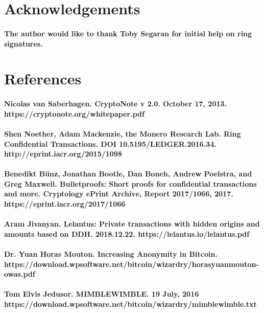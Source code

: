 \documentclass{article}
\begin{document}
\section{Acknowledgements}

\paragraph{The author would like to thank Toby Segaran for initial help on ring signatures.}



\section{References}

\paragraph{Nicolas van Saberhagen. CryptoNote v 2.0. October 17, 2013. https://cryptonote.org/whitepaper.pdf}

\paragraph{Shen Noether, Adam Mackenzie, the Monero Research Lab. Ring Confidential Transactions. DOI 10.5195/LEDGER.2016.34. http://eprint.iacr.org/2015/1098}

\paragraph{Benedikt Bünz, Jonathan Bootle, Dan Boneh, Andrew Poelstra, and Greg Maxwell. Bulletproofs: Short proofs for confidential transactions and more. Cryptology ePrint Archive, Report 2017/1066, 2017. https://eprint.iacr.org/2017/1066}

\paragraph{Aram Jivanyan. Lelantus: Private transactions with hidden origins and amounts based on DDH. 2018.12.22. https://lelantus.io/lelantus.pdf}

\paragraph{Dr. Yuan Horas Mouton. Increasing Anonymity in Bitcoin. https://download.wpsoftware.net/bitcoin/wizardry/horasyuanmouton-owas.pdf}

\paragraph{Tom Elvis Jedusor. MIMBLEWIMBLE. 19 July, 2016 https://download.wpsoftware.net/bitcoin/wizardry/mimblewimble.txt}
\end{document}
